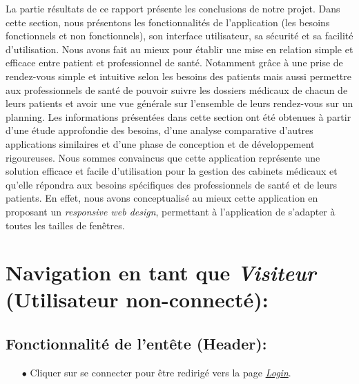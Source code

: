 \documentclass[a4paper]{report}
\begin{document}
La partie résultats de ce rapport présente les conclusions de notre projet. Dans cette section, nous présentons les fonctionnalités de l'application (les besoins fonctionnels et non fonctionnels), son interface utilisateur, sa sécurité et sa facilité d'utilisation. Nous avons fait au mieux pour établir une mise en relation simple et efficace entre patient et professionnel de santé. Notamment grâce à une prise de rendez-vous simple et intuitive selon les besoins des patients mais aussi permettre aux professionnels de santé de pouvoir suivre les dossiers médicaux de chacun de leurs patients et avoir une vue générale sur l'ensemble de leurs rendez-vous sur un planning. Les informations présentées dans cette section ont été obtenues à partir d'une étude approfondie des besoins, d'une analyse comparative d'autres applications similaires et d'une phase de conception et de développement rigoureuses. Nous sommes convaincus que cette application représente une solution efficace et facile d'utilisation pour la gestion des cabinets médicaux et qu'elle répondra aux besoins spécifiques des professionnels de santé et de leurs patients. En effet, nous avons conceptualisé au mieux cette application en proposant un \textit{responsive web design}, permettant à l'application de s'adapter à toutes les tailles de fenêtres.
\newline
\newline

\section{\noindent Navigation en tant que \textit{Visiteur} {\fontsize{12}{16}\selectfont(Utilisateur non-connecté)}: }

\subsection{Fonctionnalité de l'entête (Header):}
    \begin{itemize} 
        \item[$\bullet$] Cliquer sur se connecter pour être redirigé vers la page \textit{\hyperref[login]{Login}}.
    \end{itemize}
    \vspace{3mm}
\end{document}
